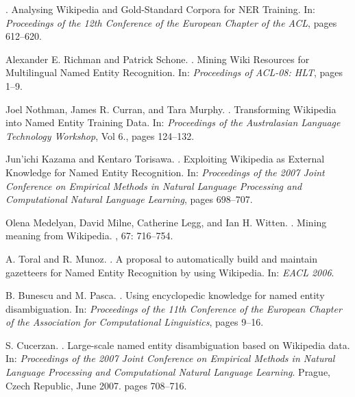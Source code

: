 \documentclass[11pt]{article}
\begin{document}
\begin{thebibliography}{}

.
\newblock Analysing Wikipedia and Gold-Standard Corpora for NER Training.
\newblock In: {\em Proceedings of the 12th Conference of the European Chapter of the ACL}, pages 612--620.

Alexander E. Richman and Patrick Schone.
.
\newblock Mining Wiki Resources for Multilingual Named Entity Recognition.
\newblock In: {\em Proceedings of ACL-08: HLT}, pages 1--9.

Joel Nothman, James R. Curran, and Tara Murphy.
.
\newblock Transforming Wikipedia into Named Entity Training Data.
\newblock In: {\em Proceedings of the Australasian Language Technology Workshop}, Vol 6., pages 124--132.

Jun'ichi Kazama and Kentaro Torisawa.
.
\newblock Exploiting Wikipedia as External Knowledge for Named Entity Recognition.
\newblock In: {\em Proceedings of the 2007 Joint Conference on Empirical Methods in Natural Language Processing and Computational Natural Language Learning}, pages 698--707.

Olena Medelyan, David Milne, Catherine Legg, and Ian H. Witten.
.
\newblock Mining meaning from Wikipedia.
, 67: 716--754.

A. Toral and R. Munoz.
.
\newblock A proposal to automatically build and maintain gazetteers for Named Entity Recognition by using Wikipedia.
\newblock In: {\em EACL 2006}.

B. Bunescu and M. Pasca.
.
\newblock Using encyclopedic knowledge for named entity disambiguation.
\newblock In: {\em Proceedings of the 11th Conference of the European Chapter of the Association for Computational Linguistics}, pages 9--16.

S. Cucerzan.
.
\newblock Large-scale named entity disambiguation based on Wikipedia data.
\newblock In: {\em Proceedings of the 2007 Joint Conference on Empirical Methods in Natural Language Processing and Computational Natural Language Learning}.
\newblock Prague, Czech Republic, June 2007. pages 708--716.


\end{thebibliography}
\end{document}
